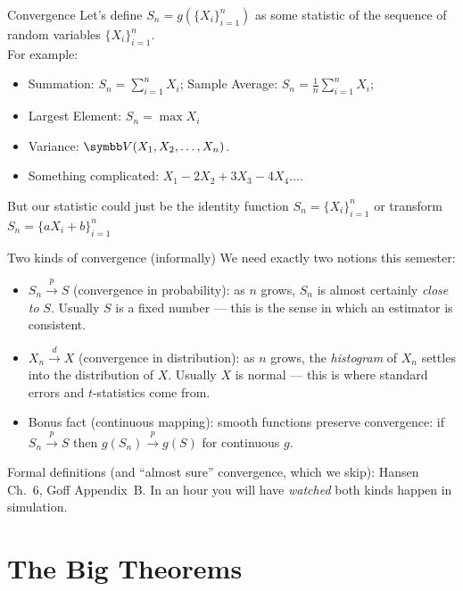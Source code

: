 \documentclass[aspectratio=169,11pt]{beamer}
\begin{document}
\begin{frame}{Convergence}
Let's define $S_n = g( \{X_i\}_{i=1}^n)$ as some \alert{statistic} of the sequence of random variables $\{X_i\}_{i=1}^n$.\\
 For example:
\begin{itemize}
	\item Summation: $S_n = \sum_{i=1}^n X_i$; Sample Average: $S_n = \frac{1}{n}\sum_{i=1}^n X_i$;
	\item Largest Element: $S_n = \max  X_i$
	\item Variance: $\Var(X_1,X_2,\ldots,X_n)$.
	\item Something complicated: $X_1 - 2 X_2 + 3 X_3 - 4 X_4 \ldots$.
\end{itemize}
But our statistic could just be the identity function $S_n = \{X_i\}_{i=1}^n$ or transform $S_n = \{a X_i +b\}_{i=1}^n$ 
\end{frame}



\begin{frame}{Two kinds of convergence (informally)}
We need exactly two notions this semester:
\begin{itemize}
	\item $S_n \overset{p}{\to} S$ (\alert{convergence in probability}): as $n$ grows, $S_n$ is
	almost certainly \emph{close to} $S$. Usually $S$ is a \alert{fixed number} --- this is the
	sense in which an estimator is \alert{consistent}.

	\medskip
	\item $X_n \overset{d}{\to} X$ (\alert{convergence in distribution}): as $n$ grows, the
	\emph{histogram} of $X_n$ settles into the distribution of $X$. Usually $X$ is
	\alert{normal} --- this is where standard errors and $t$-statistics come from.

	\medskip
	\item Bonus fact (\alert{continuous mapping}): smooth functions preserve convergence:
	if $S_n \overset{p}{\to} S$ then $g(S_n) \overset{p}{\to} g(S)$ for continuous $g$.
\end{itemize}
\medskip
Formal definitions (and ``almost sure'' convergence, which we skip): Hansen Ch.~6, Goff Appendix~B.
In an hour you will have \emph{watched} both kinds happen in simulation.
\end{frame}




\section{The Big Theorems}
\end{document}
